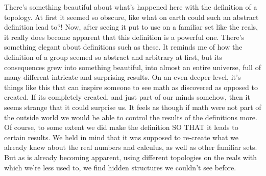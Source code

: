 \documentclass{article}
\theoremstyle{definition}
\begin{document}
 There's something beautiful about what's happened here with the definition of a topology. At first it seemed so obscure, like what on earth could such an abstract definition lead to?! Now, after seeing it put to use on a familiar set like the reals, it really does become apparent that this definition is a powerful one. There's something elegant about definitions such as these. It reminds me of how the definition of a group seemed so abstract and arbitrary at first, but its consequences grew into something beautiful, into almost an entire universe, full of many different intricate and surprising results. On an even deeper level, it's things like this that can inspire someone to see math as discovered as opposed to created. If its completely created, and just part of our minds somehow, then it seems strange that it could surprise us. It feels as though  if math were not part of the outside world we would be able to control the results of the definitions more. Of course, to some extent we did make the definition SO THAT it leads to certain results. We held in mind that it was supposed to re-create what we already knew about the real numbers and calculus, as well as other familiar sets. But as is already becoming apparent, using different topologies on the reals with which we're less used to, we find hidden structures we couldn't see before. \\
\end{document}
